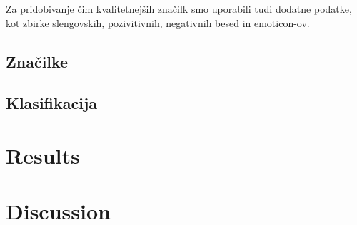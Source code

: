 \documentclass[a4paper]{article}
\begin{document}
Za pridobivanje čim kvalitetnejših značilk smo uporabili tudi dodatne podatke, kot zbirke slengovskih, pozivitivnih, negativnih besed in emoticon-ov.

\subsection{Značilke}



\subsection{Klasifikacija}

\section{Results}



\section{Discussion}
\end{document}
